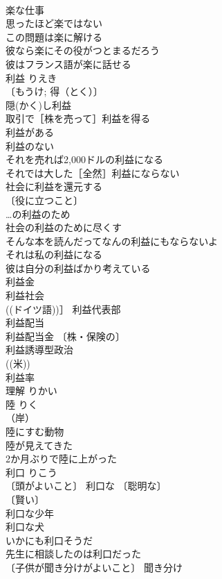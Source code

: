 \documentclass[8pt]{extreport}
\begin{document}
\begin{CJK}{UTF8}{min}
\\	楽な仕事 
\\	思ったほど楽ではない 
\\	この問題は楽に解ける 
\\	彼なら楽にその役がつとまるだろう 
\\	彼はフランス語が楽に話せる 
\\	利益	りえき	
\\	〔もうけ; 得（とく）〕
\\	隠(かく)し利益 
\\	取引で［株を売って］利益を得る 
\\	利益がある 
\\	利益のない 
\\	それを売れば2,000ドルの利益になる 
\\	それでは大した［全然］利益にならない 
\\	社会に利益を還元する 
\\	〔役に立つこと〕
\\	…の利益のため 
\\	社会の利益のために尽くす 
\\	そんな本を読んだってなんの利益にもならないよ 
\\	それは私の利益になる 
\\	彼は自分の利益ばかり考えている 
\\	利益金 
\\	利益社会 
\\	((ドイツ語))］ 利益代表部 
\\	利益配当 
\\	利益配当金 〔株・保険の〕
\\	利益誘導型政治 
\\	((米)) 
\\	利益率 
\\	理解	りかい	
\\	陸	りく	
\\	（岸）
\\	陸にすむ動物 
\\	陸が見えてきた 
\\	2か月ぶりで陸に上がった 
\\	利口	りこう	
\\	〔頭がよいこと〕 利口な 〔聡明な〕
\\	〔賢い〕
\\	利口な少年 
\\	利口な犬 
\\	いかにも利口そうだ 
\\	先生に相談したのは利口だった 
\\	〔子供が聞き分けがよいこと〕 聞き分け 

\end{CJK}
\end{document}
